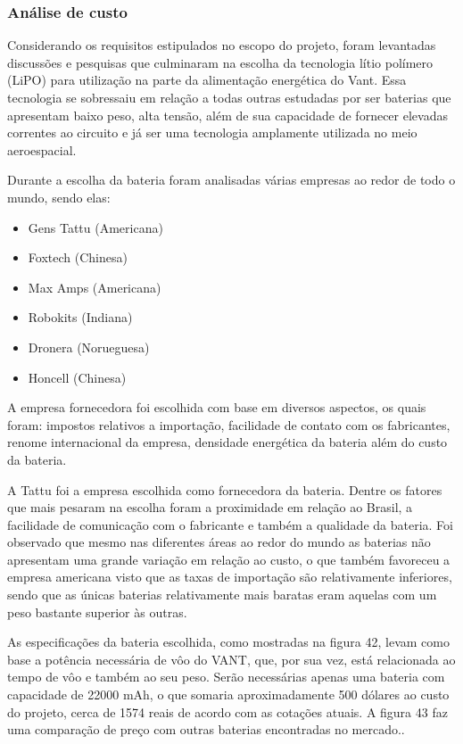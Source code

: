 \subsubsection{Análise de custo}
Considerando os requisitos estipulados no escopo do projeto, foram levantadas discussões e pesquisas que culminaram na escolha da tecnologia lítio polímero (LiPO) para utilização na parte da alimentação energética do Vant. Essa tecnologia se sobressaiu em relação a todas outras estudadas por ser baterias que apresentam baixo peso, alta tensão, além de sua capacidade de fornecer elevadas correntes ao circuito e já ser uma tecnologia amplamente utilizada no meio aeroespacial.

Durante a escolha da bateria foram analisadas várias empresas ao redor de todo o mundo, sendo elas:

\begin{itemize}
 
\item Gens Tattu (Americana)

\item Foxtech (Chinesa)

\item Max Amps (Americana)

\item Robokits (Indiana)

\item Dronera (Norueguesa)

\item Honcell (Chinesa)

\end{itemize}

A empresa fornecedora foi escolhida com base em diversos aspectos, os quais foram: impostos relativos a importação, facilidade de contato com os fabricantes, renome internacional da empresa, densidade energética da bateria além do custo da bateria.

A  Tattu foi a empresa escolhida como fornecedora da bateria.  Dentre os fatores que mais pesaram na escolha foram a proximidade em relação ao Brasil, a facilidade de comunicação com o fabricante e também a qualidade da bateria. Foi observado que mesmo nas diferentes áreas ao redor do mundo as baterias não apresentam uma grande variação em relação ao custo, o que também favoreceu a empresa americana visto que as taxas de importação são relativamente inferiores, sendo que as únicas baterias relativamente mais baratas eram aquelas com um peso bastante superior às outras.

As especificações da bateria escolhida, como mostradas na figura 42, levam como base a potência  necessária de vôo do VANT, que, por sua vez, está relacionada ao tempo de vôo e também ao seu peso. Serão  necessárias  apenas  uma  bateria com capacidade  de  22000 mAh,  o que  somaria aproximadamente 500 dólares ao custo do projeto, cerca de 1574 reais de acordo com as cotações  atuais. A figura 43 faz uma comparação de preço com outras baterias encontradas no mercado..


